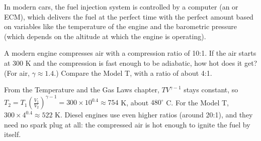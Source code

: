 In modern cars, the fuel injection system is controlled by a computer (an  or ECM), which delivers the fuel at the perfect time with the perfect amount based on variables like the temperature of the engine and the barometric pressure (which depends on the altitude at which the engine is operating).

\begin{Exercise}[title={Hot from Compression}, label=engine_compress]
A modern engine compresses air with a compression ratio of 10:1. If the
air starts at 300 K and the compression is fast enough to be adiabatic,
how hot does it get? (For air, $\gamma \approx 1.4$.) Compare the Model T,
with a ratio of about 4:1.
\end{Exercise}
\begin{Answer}[ref=engine_compress]
From the Temperature and the Gas Laws chapter, $TV^{\gamma - 1}$ stays constant, so
$T_2 = T_1\left(\frac{V_1}{V_2}\right)^{\gamma - 1} = 300 \times 10^{0.4}
\approx 754$ K, about $480^\circ$ C. For the Model T, $300 \times 4^{0.4}
\approx 522$ K. Diesel engines use even higher ratios (around 20:1), and
they need no spark plug at all: the compressed air is hot enough to ignite
the fuel by itself.
\end{Answer}
